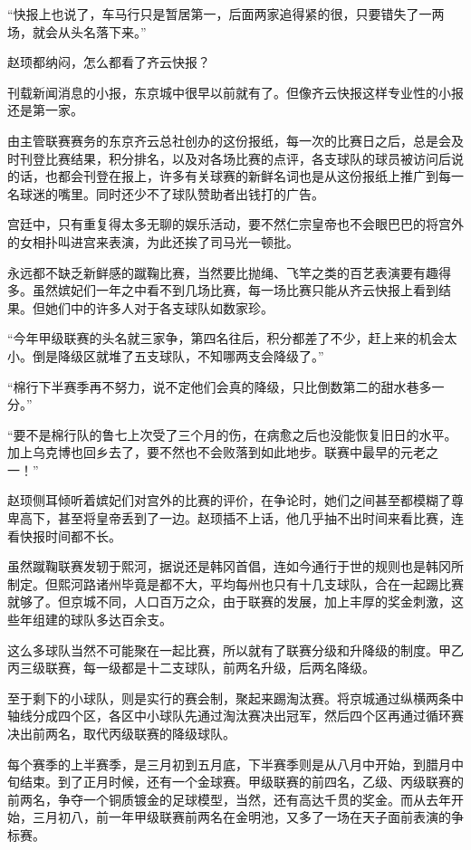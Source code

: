 “快报上也说了，车马行只是暂居第一，后面两家追得紧的很，只要错失了一两场，就会从头名落下来。”

赵顼都纳闷，怎么都看了齐云快报？

刊载新闻消息的小报，东京城中很早以前就有了。但像齐云快报这样专业性的小报还是第一家。

由主管联赛赛务的东京齐云总社创办的这份报纸，每一次的比赛日之后，总是会及时刊登比赛结果，积分排名，以及对各场比赛的点评，各支球队的球员被访问后说的话，也都会刊登在报上，许多有关球赛的新鲜名词也是从这份报纸上推广到每一名球迷的嘴里。同时还少不了球队赞助者出钱打的广告。

宫廷中，只有重复得太多无聊的娱乐活动，要不然仁宗皇帝也不会眼巴巴的将宫外的女相扑叫进宫来表演，为此还挨了司马光一顿批。

永远都不缺乏新鲜感的蹴鞠比赛，当然要比抛绳、飞竿之类的百艺表演要有趣得多。虽然嫔妃们一年之中看不到几场比赛，每一场比赛只能从齐云快报上看到结果。但她们中的许多人对于各支球队如数家珍。

“今年甲级联赛的头名就三家争，第四名往后，积分都差了不少，赶上来的机会太小。倒是降级区就堆了五支球队，不知哪两支会降级了。”

“棉行下半赛季再不努力，说不定他们会真的降级，只比倒数第二的甜水巷多一分。”

“要不是棉行队的鲁七上次受了三个月的伤，在病愈之后也没能恢复旧日的水平。加上乌克博也回乡去了，要不然也不会败落到如此地步。联赛中最早的元老之一！”

赵顼侧耳倾听着嫔妃们对宫外的比赛的评价，在争论时，她们之间甚至都模糊了尊卑高下，甚至将皇帝丢到了一边。赵顼插不上话，他几乎抽不出时间来看比赛，连看快报时间都不长。

虽然蹴鞠联赛发轫于熙河，据说还是韩冈首倡，连如今通行于世的规则也是韩冈所制定。但熙河路诸州毕竟是都不大，平均每州也只有十几支球队，合在一起踢比赛就够了。但京城不同，人口百万之众，由于联赛的发展，加上丰厚的奖金刺激，这些年组建的球队多达百余支。

这么多球队当然不可能聚在一起比赛，所以就有了联赛分级和升降级的制度。甲乙丙三级联赛，每一级都是十二支球队，前两名升级，后两名降级。

至于剩下的小球队，则是实行的赛会制，聚起来踢淘汰赛。将京城通过纵横两条中轴线分成四个区，各区中小球队先通过淘汰赛决出冠军，然后四个区再通过循环赛决出前两名，取代丙级联赛的降级球队。

每个赛季的上半赛季，是三月初到五月底，下半赛季则是从八月中开始，到腊月中旬结束。到了正月时候，还有一个金球赛。甲级联赛的前四名，乙级、丙级联赛的前两名，争夺一个铜质镀金的足球模型，当然，还有高达千贯的奖金。而从去年开始，三月初八，前一年甲级联赛前两名在金明池，又多了一场在天子面前表演的争标赛。

